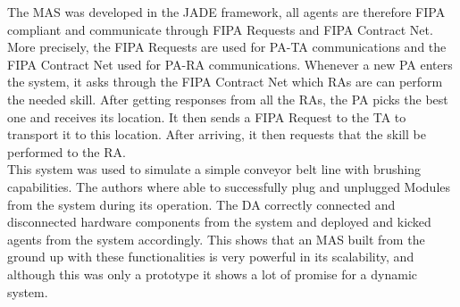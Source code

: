 The MAS was developed in the JADE framework, all agents are therefore FIPA compliant and communicate through FIPA Requests and FIPA Contract Net. More precisely, the FIPA Requests are used for PA-TA communications and the FIPA Contract Net used for PA-RA communications. Whenever a new PA enters the system, it asks through the FIPA Contract Net which RAs are can perform the needed skill. After getting responses from all the RAs, the PA picks the best one and receives its location. It then sends a FIPA Request to the TA to transport it to this location. After arriving, it then requests that the skill be performed to the RA.\\

This system was used to simulate a simple conveyor belt line with brushing capabilities. The authors where able to successfully plug and unplugged Modules from the system during its operation. The DA correctly connected and disconnected hardware components from the system and deployed and kicked agents from the system accordingly. This shows that an MAS built from the ground up with these functionalities is very powerful in its scalability, and although this was only a prototype it shows a lot of promise for a dynamic system.


%
%
